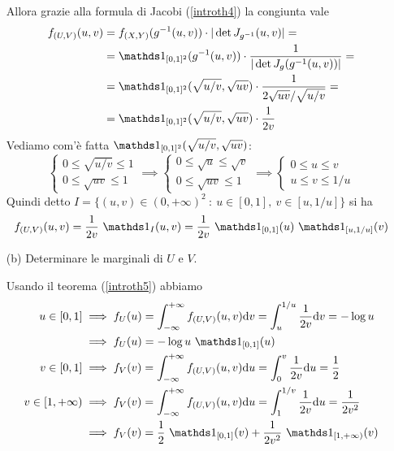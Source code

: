 \begin{enumerate}
Allora grazie alla formula di Jacobi (\ref{introth4}) la congiunta vale
\begin{gather*}
\begin{aligned}
f_{(U,V)}(u,v)&=\fXY(g^{-1}(u,v))\cdot |\det J_{g^{-1}}(u,v)|=\\
&=\Ind_{[0,1]^2}(g^{-1}(u,v))\cdot\frac{1}{|\det J_g(g^{-1}(u,v))|}=\\
&=\Ind_{[0,1]^2}(\sqrt{u/v},\sqrt{uv})\cdot\frac{1}{2\sqrt{uv}/\sqrt{u/v}}=\\
&=\Ind_{[0,1]^2}(\sqrt{u/v},\sqrt{uv})\cdot\frac{1}{2v}
\end{aligned}
\end{gather*}
Vediamo com'è fatta $\Ind_{[0,1]^2}(\sqrt{u/v},\sqrt{uv})$:
\[
\begin{cases}0\leq\sqrt{u/v}\leq 1  \\ 0\leq \sqrt{uv}\leq 1 \end{cases}
\implies
\begin{cases}0\leq\sqrt{u}\leq \sqrt{v}  \\ 0\leq \sqrt{uv}\leq 1 \end{cases}
\implies
\begin{cases}0\leq u\leq v  \\ u\leq v\leq 1/u \end{cases}
\]
Quindi detto $I=\{(u,v)\in(0,+\infty)^2\ :\ u\in[0,1],\ v\in[u,1/u]  \}$ si ha
\[
f_{(U,V)}(u,v)=\frac{1}{2v}\ \Ind_I(u,v)=\frac{1}{2v}\ \Ind_{[0,1]}(u)\ \Ind_{[u,1/u]}(v)
\]

\item [(b)] Determinare le marginali di $U$ e $V$.

Usando il teorema (\ref{introth5}) abbiamo
\begin{gather*}
\begin{aligned}
u\in[0,1]&\implies f_{U}(u)=\int_{-\infty}^{+\infty} f_{(U,V)}(u,v)\dv=\int_u^{1/u}\frac{1}{2v}\dv=-\log u \\
&\implies  f_{U}(u)=-\log u \ \Ind_{[0,1]}(u) \\
v\in[0,1]&\implies f_V(v)=\int_{-\infty}^{+\infty} f_{(U,V)}(u,v)\du=\int_0^v \frac{1}{2v}\du=\frac{1}{2} \\
v\in[1,+\infty)&\implies f_V(v)=\int_{-\infty}^{+\infty} f_{(U,V)}(u,v)\du=\int_1^{1/v} \frac{1}{2v}\du=\frac{1}{2v^2} \\
&\implies f_V(v)=\frac{1}{2}\ \Ind_{[0,1]}(v)+\frac{1}{2v^2}\ \Ind_{[1,+\infty)}(v)
\end{aligned}
\end{gather*}

\end{enumerate}

